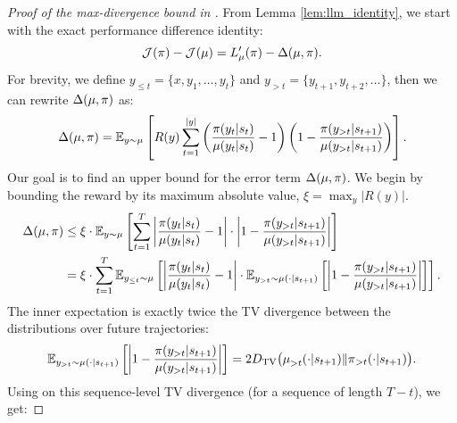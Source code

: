 \begin{proof}[Proof of the max-divergence bound in ]
From Lemma \ref{lem:llm_identity}, we start with the exact performance difference identity:  
\begin{equation*}  
\mathcal{J}(\trainerpi) - \mathcal{J}(\rolloutpi) = L_{\rolloutpi}'(\trainerpi) - \Delta(\rolloutpi, \trainerpi).  
\end{equation*}  
For brevity, we define $y_{\leq t} = \{x, y_1, \dots, y_t \}$ and $y_{>t} = \{y_{t+1}, y_{t+2}, \dots \}$, then we can rewrite $\Delta(\rolloutpi, \trainerpi)$ as:
\begin{equation*}
\Delta(\rolloutpi, \trainerpi) = \mathbb{E}_{y \sim \rolloutpi} \left[ R(y) \sum_{t=1}^{|y|} \left( \frac{\trainerpi(y_t|s_t)}{\rolloutpi(y_t|s_t)} - 1 \right) \left( 1 - \frac{\trainerpi(y_{>t}|s_{t+1})}{\rolloutpi(y_{>t}|s_{t+1})}  \right) \right].  
\end{equation*}
Our goal is to find an upper bound for the error term $\Delta(\rolloutpi, \trainerpi)$. We begin by bounding the reward by its maximum absolute value, $\xi = \max_{y} |R(y)|$.  
\begin{align}  
\label{eq:delta_bound_intermediate}
\begin{split}
\Delta(\rolloutpi, \trainerpi) &\le \xi \cdot \mathbb{E}_{y \sim \rolloutpi} \left[ \sum_{t=1}^{T} \left| \frac{\trainerpi(y_t|s_t)}{\rolloutpi(y_t|s_t)} - 1 \right| \cdot \left| 1 - \frac{\trainerpi(y_{>t}|s_{t+1})}{\rolloutpi(y_{>t}|s_{t+1})} \right| \right] \\  
&= \xi \cdot \sum_{t=1}^{T} \mathbb{E}_{y_{\le t} \sim \rolloutpi} \left[ \left| \frac{\trainerpi(y_t|s_t)}{\rolloutpi(y_t|s_t)} - 1 \right| \cdot \mathbb{E}_{y_{>t} \sim \rolloutpi(\cdot|s_{t+1})} \left[ \left| 1 - \frac{\trainerpi(y_{>t}|s_{t+1})}{\rolloutpi(y_{>t}|s_{t+1})} \right| \right] \right].  
\end{split}
\end{align}  
The inner expectation is exactly twice the TV divergence between the distributions over future trajectories:  
\begin{equation*}  
\mathbb{E}_{y_{>t} \sim \rolloutpi(\cdot|s_{t+1})} \left[ \left| 1 - \frac{\trainerpi(y_{>t}|s_{t+1})}{\rolloutpi(y_{>t}|s_{t+1})} \right| \right] = 2 D_{\mathrm{TV}}\big({\rolloutpi}_{>t}(\cdot|s_{t+1}) \|  {\trainerpi}_{>t}(\cdot|s_{t+1})\big).  
\end{equation*}  
Using  on this sequence-level TV divergence (for a sequence of length $T-t$), we get:  

\end{proof}

